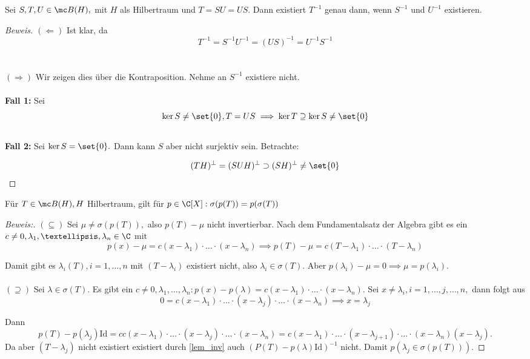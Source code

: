 
\begin{lemma} Sei $S, T, U \in \mc B(H),$ mit $H$ als Hilbertraum und $T = SU = US.$ Dann existiert $T^{-1}$ genau dann, wenn $S^{-1}$ und $U^{-1}$ existieren. 
	
	
	\begin{proof}[Beweis] $(\Leftarrow)$ Ist klar, da \[T^{-1} = S^{-1}U^{-1} = (US)^{-1} = U^{-1}S^{-1}\] \\ \\
		
		$(\Rightarrow)$ Wir zeigen dies über die Kontraposition. Nehme an $S^{-1}$ existiere nicht. \\ \\
		
		\textbf{Fall 1:} Sei \[\ker{S} \not= \set{0}, T = US \implies \ker{T} \supseteq \ker{S} \not= \set{0}\] \\
		
		\textbf{Fall 2:} Sei $\ker{S} = \set{0}.$ Dann kann $S$ aber nicht surjektiv sein. Betrachte:
		
		\[(TH)^{\perp} = (SUH)^{\perp} \supset (SH)^{\perp} \not= \set{0}\] 
		
		
	\end{proof}
	
\end{lemma}


\begin{theorem} \label{lem_inv} Für $T \in \mc B(H), H$ Hilbertraum, gilt für $p \in \C[X]: \sigma(p(T))= p(\sigma(T))$
	
	
	\begin{proof}[Beweis:] $(\subseteq)$ Sei $\mu \not= \sigma(p(T)),$ also $p(T)-\mu$ nicht invertierbar. Nach dem Fundamentalsatz der Algebra gibt es ein $c \not= 0, \lambda_1, …, \lambda_n \in \C$ mit \[p(x)- \mu = c(x- \lambda_1)\cdot \dots \cdot (x- \lambda_n) \implies p(T)-\mu = c(T-\lambda_1) \cdot … \cdot (T- \lambda_n)\]
		
		Damit gibt es $\lambda_i (T), i = 1, …, n$ mit $(T- \lambda_i)$ existiert nicht, also $\lambda_i \in \sigma(T).$ Aber $p(\lambda_i)- \mu = 0 \implies \mu = p(\lambda_i).$ \\ \\
		
		$(\supseteq)$ Sei $\lambda \in \sigma(T).$ Es gibt ein $c \not= 0, \lambda_1, …, \lambda_n: p(x)-p(\lambda) = c(x-\lambda_1)\cdot \dots \cdot (x- \lambda_n).$ Sei $x \not= \lambda_i, i = 1, \dots,j, \dots, n,$ dann folgt aus \[0 = c(x- \lambda_1)\cdot \dots \cdot (x- \lambda_j) \cdot \dots \cdot (x- \lambda_n) \implies x= \lambda_j\]
		
		Dann \[p(T)-p(\lambda_j)\text{Id} = cc(x- \lambda_1)\cdot \dots \cdot (x- \lambda_j) \cdot \dots \cdot (x- \lambda_n) = c(x- \lambda_1)\cdot \dots \cdot (x- \lambda_{j+1}) \cdot \dots \cdot (x- \lambda_n) (x- \lambda_j).\] Da aber $(T-\lambda_j)$ nicht existiert existiert durch \ref{lem_inv} auch $(P(T)-p(\lambda)\text{Id})^{-1}$ nicht. Damit $p(\lambda_j \in \sigma(p(T))).$
		
	\end{proof}
	
\end{theorem}


